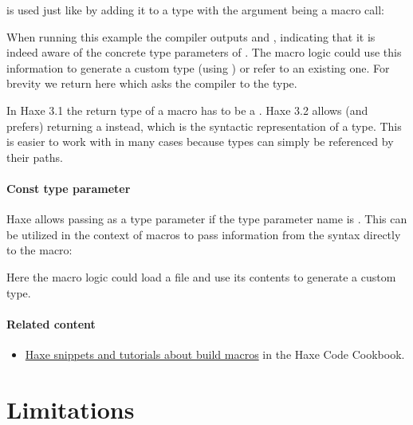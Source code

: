  is used just like  by adding it to a type with the argument being a macro call:



When running this example the compiler outputs  and , indicating that it is indeed aware of the concrete type parameters of . The macro logic could use this information to generate a custom type (using ) or refer to an existing one. For brevity we return  here which asks the compiler to  the type.

In Haxe 3.1 the return type of a  macro has to be a . Haxe 3.2 allows (and prefers) returning a  instead, which is the syntactic representation of a type. This is easier to work with in many cases because types can simply be referenced by their paths.

\paragraph{Const type parameter}

Haxe allows passing  as a type parameter if the type parameter name is . This can be utilized in the context of  macros to pass information from the syntax directly to the macro:



Here the macro logic could load a file and use its contents to generate a custom type.

\paragraph{Related content}
\begin{itemize}
	\item \href{http://code.haxe.org/tag/build-macro.html}{Haxe snippets and tutorials about build macros} in the Haxe Code Cookbook.
\end{itemize}

\section{Limitations}
\label{macro-limitations}

